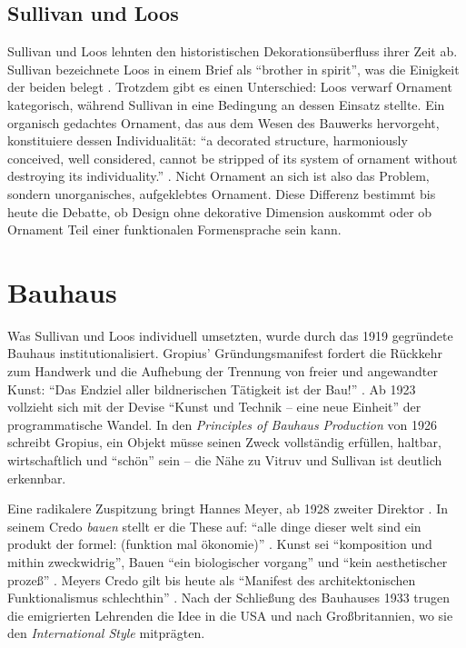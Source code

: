 \documentclass[
    a4paper,
    11pt,
    bibliography=totoc,
    listof=totoc,
    parskip=half,
    headings=normal
]{scrbook}
\begin{document}
\subsection{Sullivan und Loos}
Sullivan und Loos lehnten den historistischen Dekorationsüberfluss ihrer Zeit ab. Sullivan bezeichnete Loos in einem Brief als \enquote{brother in spirit}, was die Einigkeit der beiden belegt \autocite[11]{mossConstructingModernVienna2010}. Trotzdem gibt es einen Unterschied: Loos verwarf Ornament kategorisch, während Sullivan in  eine Bedingung an dessen Einsatz stellte. Ein organisch gedachtes Ornament, das aus dem Wesen des Bauwerks hervorgeht, konstituiere dessen Individualität: \enquote{a decorated structure, harmoniously conceived, well considered, cannot be
stripped of its system of ornament without destroying its individuality.}
\autocite{sullivanOrnamentInArchitec}. Nicht Ornament an sich ist also das Problem, sondern unorganisches, aufgeklebtes Ornament. Diese Differenz bestimmt bis heute die Debatte, ob Design ohne dekorative Dimension auskommt oder ob Ornament Teil einer funktionalen Formensprache sein kann.

\section{Bauhaus}
Was Sullivan und Loos individuell umsetzten, wurde durch das 1919 gegründete Bauhaus institutionalisiert. Gropius' Gründungsmanifest fordert die Rückkehr zum Handwerk und die Aufhebung der Trennung von freier und angewandter Kunst: \enquote{Das Endziel aller bildnerischen Tätigkeit ist der Bau!} \autocite{goetheInstitutManifest1919}. Ab 1923 vollzieht sich mit der Devise \enquote{Kunst und Technik -- eine neue Einheit} der programmatische Wandel. In den \textit{Principles of Bauhaus Production} von 1926 schreibt Gropius, ein Objekt müsse seinen Zweck vollständig erfüllen, haltbar, wirtschaftlich und \enquote{schön} sein \autocite{gropiusPrinciplesBauhausProduction1926} -- die Nähe zu Vitruv und Sullivan ist deutlich erkennbar.

Eine radikalere Zuspitzung bringt Hannes Meyer, ab 1928 zweiter Direktor \autocite{kleinerüschkampMeyerHannesNDB1994}. In seinem Credo \textit{bauen} stellt er die These auf: \enquote{alle dinge dieser welt sind ein produkt der formel: (funktion mal ökonomie)} \autocite{meyerBauen1928}. Kunst sei \enquote{komposition und mithin zweckwidrig}, Bauen \enquote{ein biologischer vorgang} und \enquote{kein aesthetischer prozeß} \autocite{meyerBauen1928}. Meyers Credo gilt bis heute als \enquote{Manifest des architektonischen Funktionalismus schlechthin} \autocite{kleinerüschkampMeyerHannesNDB1994}. Nach der Schließung des Bauhauses 1933 trugen die emigrierten Lehrenden die Idee in die USA und nach Großbritannien, wo sie den \textit{International Style} mitprägten.
\end{document}
